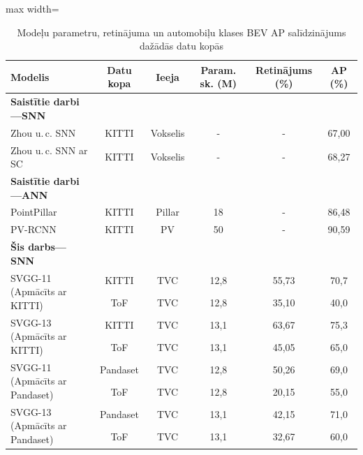 \begin{table}[ht]
\centering
\caption{Modeļu parametru, retinājuma un automobiļu klases BEV AP salīdzinājums dažādās datu kopās}
\label{table:snn_map}
\footnotesize

\setlength{\tabcolsep}{3pt}
\begin{adjustbox}{max width=\textwidth}\begin{tabular}{l c c c c c}
\toprule
\textbf{Modelis} & \textbf{Datu kopa} & \textbf{Ieeja} & \textbf{Param. sk. (M)} & \textbf{Retinājums (\%)} & \textbf{AP (\%)} \\
\midrule
\textbf{Saistītie darbi---SNN}  & & & & & \\
  Zhou u.\,c. SNN \cite{Zhou2020}  & KITTI & Vokselis & - & - & 67{,}00 \\
  Zhou u.\,c. SNN ar SC \cite{Zhou2020}  & KITTI & Vokselis & - & - & 68{,}27 \\
\midrule
\textbf{Saistītie darbi---ANN}  & & & & & \\
  PointPillar \cite{lang2019} & KITTI & Pillar & 18 & - & 86{,}48 \\
  PV-RCNN \cite{shi2020} & KITTI & PV & 50 & - & 90{,}59 \\
\midrule
\textbf{Šis darbs---SNN}  & & & & & \\
\multirow{2}{*}{\raggedright SVGG-11  (Apmācīts ar KITTI)}
    & KITTI & TVC & 12{,}8 & 55{,}73 & 70{,}7  \\
    & ToF   & TVC & 12{,}8 & 35{,}10 & 40{,}0  \\
\midrule
\multirow{2}{*}{\raggedright SVGG-13  (Apmācīts ar KITTI)}
    & KITTI & TVC & 13{,}1 &  63{,}67 & 75{,}3  \\
    & ToF   & TVC & 13{,}1 &  45{,}05 & 65{,}0  \\
\midrule
\multirow{2}{*}{\raggedright SVGG-11  (Apmācīts ar Pandaset)}
    & Pandaset & TVC & 12{,}8 & 50{,}26 & 69{,}0 \\
    & ToF      & TVC & 12{,}8 & 20{,}15 & 55{,}0 \\
\midrule
\multirow{2}{*}{\raggedright SVGG-13  (Apmācīts ar Pandaset)}
    & Pandaset & TVC & 13{,}1 & 42{,}15 & 71{,}0 \\
    & ToF      & TVC & 13{,}1 & 32{,}67 & 60{,}0 \\
\bottomrule
\end{tabular}\end{adjustbox}

\end{table}


